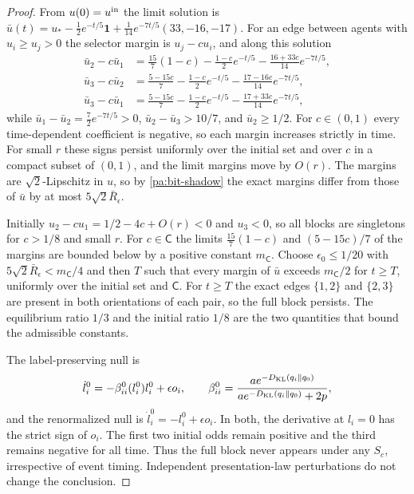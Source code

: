 \begin{proof}
From $u(0)=u^{\rm in}$ the limit solution is $\bar u(t)=u_*-\tfrac12e^{-t/5}\mathbf1+\tfrac1{14}e^{-7t/5}(33,-16,-17)$. For an edge between agents with $u_i\geq u_j>0$ the selector margin is $u_j-cu_i$, and along this solution
\begin{equation}
 \begin{aligned}
 \bar u_2-c\bar u_1&=\tfrac{15}7(1-c)-\tfrac{1-c}2e^{-t/5}-\tfrac{16+33c}{14}e^{-7t/5},\\
 \bar u_3-c\bar u_2&=\tfrac{5-15c}7-\tfrac{1-c}2e^{-t/5}-\tfrac{17-16c}{14}e^{-7t/5},\\
 \bar u_3-c\bar u_1&=\tfrac{5-15c}7-\tfrac{1-c}2e^{-t/5}-\tfrac{17+33c}{14}e^{-7t/5},
 \end{aligned}
 \label{pa:bit-margins}
\end{equation}
while $\bar u_1-\bar u_2=\tfrac72e^{-7t/5}>0$, $\bar u_2-\bar u_3>10/7$, and $\bar u_2\geq1/2$. For $c\in(0,1)$ every time-dependent coefficient is negative, so each margin increases strictly in time. For small $r$ these signs persist uniformly over the initial set and over $c$ in a compact subset of $(0,1)$, and the limit margins move by $O(r)$. The margins are $\sqrt2$-Lipschitz in $u$, so by \cref{pa:bit-shadow} the exact margins differ from those of $\bar u$ by at most $5\sqrt2\bar R_\epsilon$.

Initially $u_2-cu_1=1/2-4c+O(r)<0$ and $u_3<0$, so all blocks are singletons for $c>1/8$ and small $r$. For $c\in\mathsf C$ the limits $\tfrac{15}7(1-c)$ and $(5-15c)/7$ of the margins are bounded below by a positive constant $m_{\mathsf C}$. Choose $\epsilon_0\leq1/20$ with $5\sqrt2\bar R_\epsilon<m_{\mathsf C}/4$ and then $T$ such that every margin of $\bar u$ exceeds $m_{\mathsf C}/2$ for $t\geq T$, uniformly over the initial set and $\mathsf C$. For $t\geq T$ the exact edges $\{1,2\}$ and $\{2,3\}$ are present in both orientations of each pair, so the full block persists. The equilibrium ratio $1/3$ and the initial ratio $1/8$ are the two quantities that bound the admissible constants.

The label-preserving null is
\begin{equation}
 \dot l_i^0=-\beta_{ii}^0(l_i^0)l_i^0+\epsilon o_i,\qquad
 \beta_{ii}^0=\frac{a e^{-D_{\mathrm{KL}}(q_i\Vert q_0)}}{a e^{-D_{\mathrm{KL}}(q_i\Vert q_0)}+2p},
 \label{pa:bit-null}
\end{equation}
and the renormalized null is $\dot l_i^0=-l_i^0+\epsilon o_i$. In both, the derivative at $l_i=0$ has the strict sign of $o_i$. The first two initial odds remain positive and the third remains negative for all time. Thus the full block never appears under any $S_c$, irrespective of event timing. Independent presentation-law perturbations do not change the conclusion.
\end{proof}

